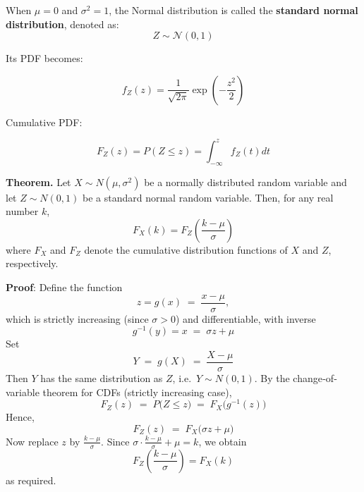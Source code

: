 \documentclass[twoside]{book}
\begin{document}
When $\mu = 0$ and $\sigma^2 = 1$, the Normal distribution is called the \textbf{standard normal distribution}, denoted as:
\[
Z \sim \mathcal{N}(0, 1)
\]

Its PDF becomes:
\begin{textbox}
\[
f_Z(z) = \frac{1}{\sqrt{2\pi}} \exp\left( -\frac{z^2}{2} \right)
\]
\end{textbox}


Cumulative PDF:
\begin{textbox}
$$F_Z(z) = P(Z \leq z) = \int_{-\infty}^z f_Z(t)dt$$
\end{textbox}

\vspace{2mm}

\begin{center}
\end{center}

\begin{textbox}
\textbf{Theorem.} Let \( X \sim N(\mu, \sigma^2) \) be a normally distributed random variable and let \( Z \sim N(0, 1) \) be a standard normal random variable. Then, for any real number \( k \),
\[
F_X(k) = F_Z\left( \frac{k - \mu}{\sigma} \right)
\]
where \( F_X \) and \( F_Z \) denote the cumulative distribution functions of \( X \) and \( Z \), respectively.
\end{textbox}

\textbf{Proof}: Define the function
\[
z = g(x) \;=\; \frac{x - \mu}{\sigma}, 
\]
which is strictly increasing (since \(\sigma>0\)) and differentiable, with inverse
\[
g^{-1}(y) = x \;=\; \sigma z + \mu
\]
Set 
\[
Y \;=\; g(X) \;=\; \frac{X - \mu}{\sigma}
\]
Then \(Y\) has the same distribution as \(Z\), i.e.\ \(Y\sim N(0,1)\).  By the change‐of‐variable theorem for CDFs (strictly increasing case),
\[
F_Z(z)
\;=\;
P\bigl(Z \le z\bigr)
\;=\;
F_X\!\bigl(g^{-1}(z)\bigr)
\]
Hence,
\[
F_Z(z)
\;=\;
F_X\!\bigl(\sigma z + \mu\bigr)
\]
Now replace \(z\) by \(\tfrac{k-\mu}{\sigma}\).  Since
\(\sigma\cdot\tfrac{k-\mu}{\sigma} + \mu = k\), we obtain
\[
F_Z\!\left( \dfrac{k - \mu}{\sigma}\right)  = F_X(k)
\]
as required.
\end{document}
